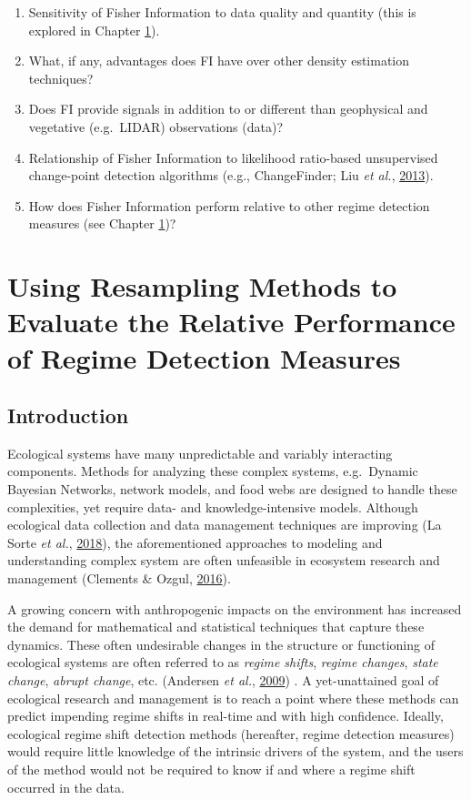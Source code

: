 \documentclass[print]{nuthesis}
\begin{document}
\begin{enumerate}
\def\labelenumi{\arabic{enumi}.}
\tightlist
\item
  Sensitivity of Fisher Information to data quality and quantity (this is explored in Chapter \ref{resampling}).
\item
  What, if any, advantages does FI have over other density estimation techniques?
\item
  Does FI provide signals in addition to or different than geophysical and vegetative (e.g.~LIDAR) observations (data)?
\item
  Relationship of Fisher Information to likelihood ratio-based unsupervised change-point detection algorithms (e.g., ChangeFinder; Liu \emph{et al.}, \protect\hyperlink{ref-liu2013change}{2013}).
\item
  How does Fisher Information perform relative to other regime detection measures (see Chapter \ref{resampling})?
\end{enumerate}
\hypertarget{resampling}{%
\chapter{Using Resampling Methods to Evaluate the Relative Performance of Regime Detection Measures}\label{resampling}}

\hypertarget{introduction-3}{%
\section{Introduction}\label{introduction-3}}

Ecological systems have many unpredictable and variably interacting components. Methods for analyzing these complex systems, e.g.~Dynamic Bayesian Networks, network models, and food webs are designed to handle these complexities, yet require data- and knowledge-intensive models. Although ecological data collection and data management techniques are improving (La Sorte \emph{et al.}, \protect\hyperlink{ref-lasorte2018opportunities}{2018}), the aforementioned approaches to modeling and understanding complex system are often unfeasible in ecosystem research and management (Clements \& Ozgul, \protect\hyperlink{ref-clements_including_2016}{2016}).

A growing concern with anthropogenic impacts on the environment has increased the demand for mathematical and statistical techniques that capture these dynamics. These often undesirable changes in the structure or functioning of ecological systems are often referred to as \emph{regime shifts}, \emph{regime changes}, \emph{state change}, \emph{abrupt change}, etc. (Andersen \emph{et al.}, \protect\hyperlink{ref-andersen_ecological_2009}{2009}) . A yet-unattained goal of ecological research and management is to reach a point where these methods can predict impending regime shifts in real-time and with high confidence. Ideally, ecological regime shift detection methods (hereafter, regime detection measures) would require little knowledge of the intrinsic drivers of the system, and the users of the method would not be required to know if and where a regime shift occurred in the data.
\end{document}
